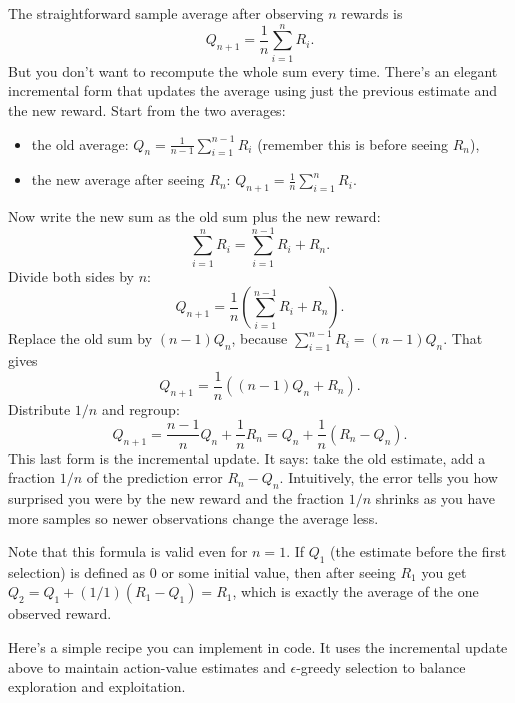 The straightforward sample average after observing $n$ rewards is
\begin{equation*}
    Q_{n+1} = \frac{1}{n}\sum_{i=1}^nR_i.
\end{equation*}
But you don’t want to recompute the whole sum every time. There’s an elegant incremental form that updates the average using just the previous estimate and the new reward. Start from the two averages:
\begin{itemize}
    \item the old average: $Q_n=\frac{1}{n-1}\sum_{i=1}^{n-1}R_i$ (remember this is before seeing $R_n$),
    \item the new average after seeing $R_n$: $Q_{n+1}=\frac{1}{n}\sum_{i=1}^nR_i$.
\end{itemize}
Now write the new sum as the old sum plus the new reward:
\begin{equation*}
    \sum_{i=1}^nR_i =\sum_{i=1}^{n-1}R_i+R_n.    
\end{equation*}
Divide both sides by $n$:
\begin{equation*}
    Q_{n+1} = \frac{1}{n}\left(\sum_{i=1}^{n-1}R_i+R_n\right).
\end{equation*}
Replace the old sum by $(n-1)Q_n$, because $\sum_{i=1}^{n-1}R_i=(n-1)Q_n$. That gives
\begin{equation*}
    Q_{n+1} = \frac{1}{n}((n-1)Q_n+R_n).
\end{equation*}
Distribute $1/n$ and regroup:
\begin{equation*}
    Q_{n+1} = \frac{n-1}{n}Q_{n}+\frac{1}{n}R_n = Q_n+\frac{1}{n}(R_n-Q_n).
\end{equation*}
This last form is the incremental update. It says: take the old estimate, add a fraction $1/n$ of the prediction error $R_n-Q_n$. Intuitively, the error tells you how surprised you were by the new reward and the fraction $1/n$ shrinks as you have more samples so newer observations change the average less.

Note that this formula is valid even for $n=1$. If $Q_1$ (the estimate before the first selection) is defined as 0 or some initial value, then after seeing $R_1$ you get $Q_2=Q_1+(1/1)(R_1-Q_1)=R_1$, which is exactly the average of the one observed reward.

Here’s a simple recipe you can implement in code. It uses the incremental update above to maintain action-value estimates and $\epsilon$-greedy selection to balance exploration and exploitation.

